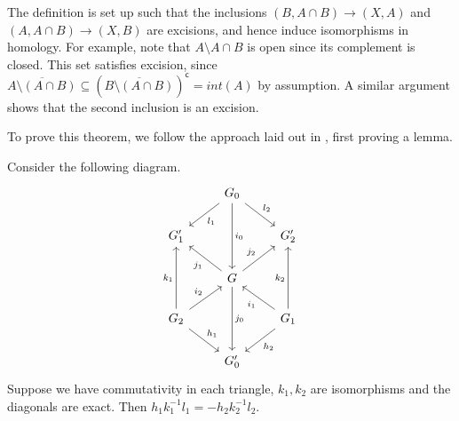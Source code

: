 \begin{remark}\label{mayer-vietoris-excision}
The definition is set up such that the inclusions $(B,A\cap B)\rightarrow(X,A)$ and $(A,A\cap B)\rightarrow(X,B)$ are excisions, and hence induce isomorphisms in homology. For example, note that $A\setminus A\cap B$ is open since its complement is closed. This set satisfies excision, since $\overline{A\setminus(A\cap B)}\subseteq (\overline{B\setminus(A\cap B)})^{\mathsf{c}}=int(A)$ by assumption. A similar argument shows that the second inclusion is an excision.
\end{remark}

To prove this theorem, we follow the approach laid out in \cite{Eilenberg}, first proving a lemma. 

\begin{lemma}\label{mayer-vietoris-lemma}
Consider the following diagram.
\[\begin{tikzcd}
                                                         & G_0 \arrow[ld, "l_1"] \arrow[rd, "l_2"] \arrow[dd, "i_0"] &                                                           \\
G_1'                                                     &                                                           & G_2'                                                      \\
                                                         & G \arrow[dd, "j_0"] \arrow[lu, "j_1"] \arrow[ru, "j_2"]   &                                                           \\
G_2 \arrow[rd, "h_1"] \arrow[ru, "i_2"] \arrow[uu, "k_1"] &                                                           & G_1 \arrow[ld, "h_2"] \arrow[lu, "i_1"] \arrow[uu, "k_2"] \\
                                                         & G_0'                                                      &                                                          
\end{tikzcd}\]
Suppose we have commutativity in each triangle, $k_1,k_2$ are isomorphisms and the diagonals are exact. Then $h_1k_1^{-1}l_1=-h_2k_2^{-1}l_2$.
\end{lemma}

